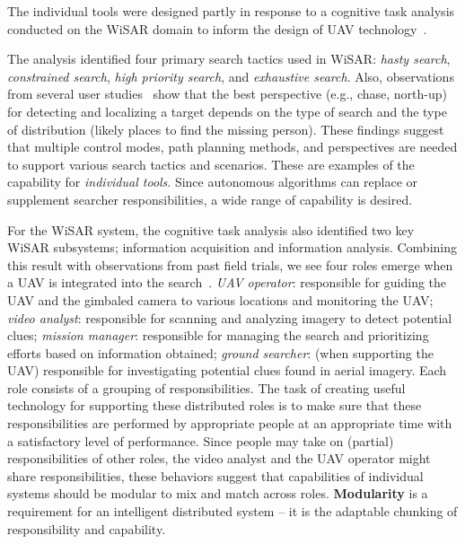 The individual tools were designed partly in response to a cognitive task analysis conducted on the WiSAR domain to inform the design of UAV technology~\cite{Adams2009Cognitive}.
 
The analysis identified four primary search tactics used in WiSAR: \textit{hasty search}, \textit{constrained search}, \textit{high priority search}, and \textit{exhaustive search}. Also, observations from several user studies~\cite{Cooper2008Towards} show that the best perspective (e.g., chase, north-up) for detecting and localizing a target depends on the type of search and the type of distribution (likely places to find the missing person). These findings suggest that multiple control modes, path planning methods, and perspectives are needed to support various search tactics and scenarios. These are examples of the capability for \textit{individual tools}. Since autonomous algorithms can replace or supplement searcher responsibilities, a wide range of capability is desired.

For the WiSAR system, the cognitive task analysis also identified two key WiSAR subsystems; information acquisition and information analysis. Combining this result with observations from past field trials, we see four roles emerge when a UAV is integrated into the search~\cite{Goodrich2008Supporting}. \textit{UAV operator}: responsible for guiding the UAV and the gimbaled camera to various locations and monitoring the UAV; \textit{video analyst}: responsible for scanning and analyzing imagery to detect potential clues; \textit{mission manager}: responsible for managing the search and prioritizing efforts based on information obtained; \textit{ground searcher}: (when supporting the UAV) responsible for investigating potential clues found in aerial imagery. Each role consists of a grouping of responsibilities. The task of creating useful technology for supporting these distributed roles is to make sure that these responsibilities are performed by appropriate people at an appropriate time with a satisfactory level of performance. Since people may take on (partial) responsibilities of other roles, the video analyst and the UAV operator might share responsibilities, these behaviors suggest that capabilities of individual systems should be modular to mix and match across roles. \textbf{Modularity} is a requirement for an intelligent distributed system -- it is the adaptable chunking of responsibility and capability.

